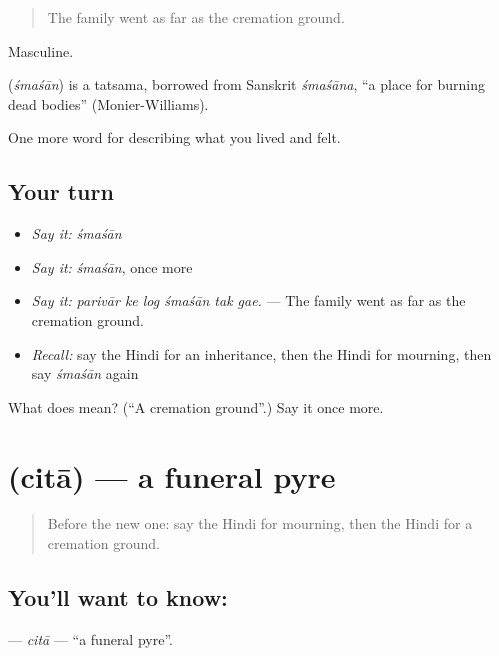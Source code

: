 \begin{quote}
The family went as far as the cremation ground.
\end{quote}

Masculine.

\begin{cousinweb}
\textbf{} (\emph{śmaśān}) is a tatsama, borrowed from Sanskrit \emph{śmaśāna}, \textquotedblleft{}a place for burning dead bodies\textquotedblright{} (Monier-Williams).
\end{cousinweb}

\begin{grammarlens}[title={What you've built}]
One more word for describing what you lived and felt.
\end{grammarlens}

\subsection*{Your turn}
\begin{itemize}
\raggedright
  \item \emph{Say it:} \emph{śmaśān}
  \item \emph{Say it:} \emph{śmaśān}, once more
  \item \emph{Say it:} \emph{parivār ke log śmaśān tak gae.} — The family went as far as the cremation ground.
  \item \emph{Recall:} say the Hindi for an inheritance, then the Hindi for mourning, then say \emph{śmaśān} again
\end{itemize}

\begin{tcolorbox}[breakable,colback=teal!4,colframe=teal!35!black,title={Before you move on}]
What does  mean? (\textquotedblleft{}A cremation ground\textquotedblright{}.) Say it once more.
\end{tcolorbox}
\section[\texorpdfstring{\hi{चिता} (citā)}{चिता (citā)}]{ (citā) — a funeral pyre}

\label{lesson:HI-C505-cita}



\begin{quote}
Before the new one: say the Hindi for mourning, then the Hindi for a cremation ground.
\end{quote}

\subsection*{You'll want to know: }
\textbf{} — \emph{citā} — \textquotedblleft{}a funeral pyre\textquotedblright{}.

